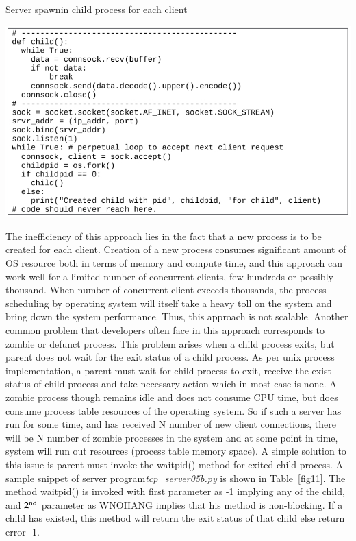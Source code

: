 \begin{table}[H]
\centering
\caption{Server spawnin child process for each client}\label{fig10}
\includegraphics[scale=2.92]{src/Figures/chap1/fig10.jpg}
\end{table}

\begin{multicols}{2}

The inefficiency of this approach lies in the fact that a new process is to be created for each client. Creation of a new process consumes significant amount of OS resource both in terms of memory and compute time, and this approach can work well for a limited number of concurrent clients, few hundreds or possibly thousand. When number of concurrent client exceeds thousands, the process scheduling by operating system will itself take a heavy toll on the system and bring down the system performance. Thus, this approach is not scalable. Another common problem that developers often face in this approach corresponds to zombie or defunct process. This problem arises when a child process exits, but parent does not wait for the exit status of a child process. As per unix process implementation, a parent must wait for child process to exit, receive the exist status of child process and take necessary action which in most case is none. A zombie process though remains idle and does not consume CPU time, but does consume process table resources of the operating system. So if such a server has run for some time, and has received N number of new client connections, there will be N number of zombie processes in the system and at some point in time, system will run out resources (process table memory space). A simple solution to this issue is parent must invoke the waitpid() method for exited child process. A sample snippet of server program\textit{tcp\_server05b.py} is shown in Table~\ref{fig11}. The method waitpid() is invoked with first parameter as -1 implying any of the child, and $2^{\rm nd}$ parameter as WNOHANG implies that his method is non-blocking. If a child has existed, this method will return the exit status of that child else return error -1.
\end{multicols}


